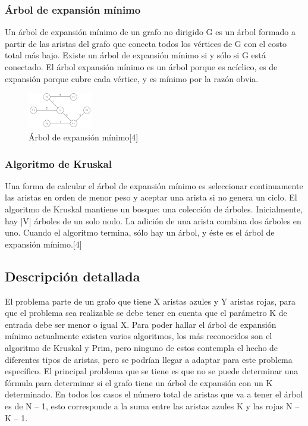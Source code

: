 \documentclass[conference,compsoc]{IEEEtran}
\begin{document}
\subsubsection{Árbol de expansión mínimo}
Un árbol de expansión mínimo de un grafo no dirigido G es un árbol formado a partir de las aristas del grafo que conecta todos los vértices de G con el costo total más bajo. Existe un árbol de expansión mínimo si y sólo si G está conectado. 
El árbol expansión mínimo es un árbol porque es acíclico, es de expansión porque cubre cada vértice, y es mínimo por la razón obvia.

\begin{figure}[h]
    \centering
    \includegraphics[width=0.25\textwidth]{Problema2/M3.png}
    \caption{Árbol de expansión mínimo[4]}
    \label{fig:mesh1}
\end{figure}


\subsubsection{Algoritmo de Kruskal}
Una forma de calcular el árbol de expansión mínimo es seleccionar continuamente las aristas en orden de menor peso y aceptar una arista si no genera un ciclo.
El algoritmo de Kruskal mantiene un bosque: una colección de árboles. Inicialmente, hay |V| árboles de un solo nodo. La adición de una arista combina dos árboles en uno. Cuando el algoritmo termina, sólo hay un árbol, y éste es el árbol de expansión mínimo.[4]


\subsection{Descripción detallada}
El problema parte de un grafo que tiene X aristas azules y Y aristas rojas, para que el problema sea realizable se debe tener en cuenta que el parámetro K de entrada debe ser menor o igual X. Para poder hallar el árbol de expansión mínimo actualmente existen varios algoritmos, los más reconocidos son el algoritmo de Kruskal y Prim, pero ninguno de estos contempla el hecho de diferentes tipos de aristas, pero se podrían llegar a adaptar para este problema específico.
El principal problema que se tiene es que no se puede determinar una fórmula para determinar si el grafo tiene un árbol de expansión con un K determinado. En todos los casos el número total de aristas que va a tener el árbol es de N – 1, esto corresponde a la suma entre las aristas azules K y las rojas N – K – 1.
\end{document}
